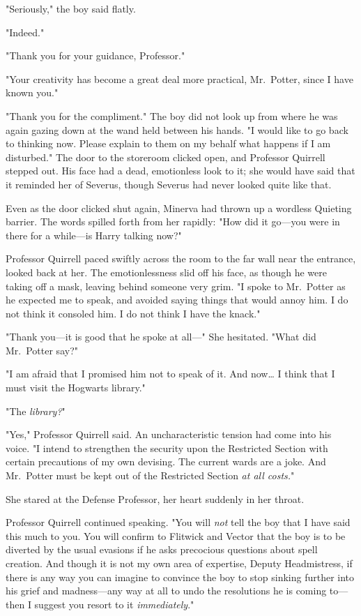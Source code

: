 "Seriously," the boy said flatly.

"Indeed."

"Thank you for your guidance, Professor."

"Your creativity has become a great deal more practical, Mr.~Potter, since I 
have known you."

"Thank you for the compliment." The boy did not look up from where he was again 
gazing down at the wand held between his hands. "I would like to go back to 
thinking now. Please explain to them on my behalf what happens if I am 
disturbed."
\sbreak
The door to the storeroom clicked open, and Professor Quirrell stepped out. His 
face had a dead, emotionless look to it; she would have said that it reminded 
her of Severus, though Severus had never looked quite like that.

Even as the door clicked shut again, Minerva had thrown up a wordless Quieting 
barrier. The words spilled forth from her rapidly: "How did it go---you were in 
there for a while---is Harry talking now?"

Professor Quirrell paced swiftly across the room to the far wall near the 
entrance, looked back at her. The emotionlessness slid off his face, as though 
he were taking off a mask, leaving behind someone very grim. "I spoke to 
Mr.~Potter as he expected me to speak, and avoided saying things that would 
annoy him. I do not think it consoled him. I do not think I have the knack."

"Thank you---it is good that he spoke at all---" She hesitated. "What did 
Mr.~Potter say?"

"I am afraid that I promised him not to speak of it. And now{\ldots} I think 
that I must visit the Hogwarts library."

"The \emph{library?}"

"Yes," Professor Quirrell said. An uncharacteristic tension had come into his 
voice. "I intend to strengthen the security upon the Restricted Section with 
certain precautions of my own devising. The current wards are a joke. And 
Mr.~Potter must be kept out of the Restricted Section \emph{at all costs.}"

She stared at the Defense Professor, her heart suddenly in her throat.

Professor Quirrell continued speaking. "You will \emph{not} tell the boy that I 
have said this much to you. You will confirm to Flitwick and Vector that the 
boy is to be diverted by the usual evasions if he asks precocious questions 
about spell creation. And though it is not my own area of expertise, Deputy 
Headmistress, if there is any way you can imagine to convince the boy to stop 
sinking further into his grief and madness---any way at all to undo the 
resolutions he is coming to---then I suggest you resort to it 
\emph{immediately}."